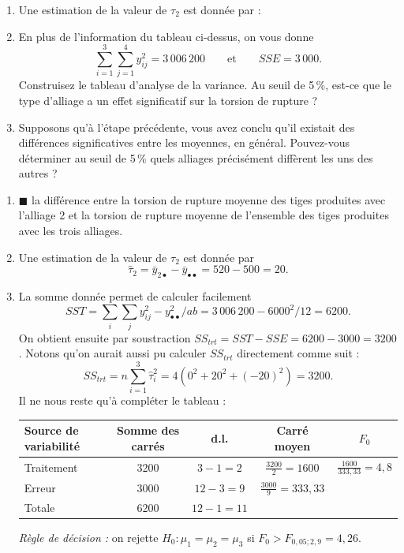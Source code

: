 \begin{exercice}
\begin{enumerate}[label=(\alph*)]
  \item Une estimation de la valeur de $\tau_2$ est donnée par :
  \item En plus de l'information du tableau ci-dessus, on vous donne
  \[
    \sum_{i=1}^{3}\sum_{j=1}^{4}y^2_{ij}=3\,006\,200
    \qquad\text{et}\qquad SSE=3\,000.
  \]
  Construisez le tableau d'analyse de la variance. Au seuil de 5\,\%, est-ce que le type
  d'alliage a un effet significatif sur la torsion de rupture ?
  \item Supposons qu'à l'étape précédente, vous avez conclu qu'il existait des différences
  significatives entre les moyennes, en général. Pouvez-vous déterminer au seuil de 5\,\%
  quels alliages précisément diffèrent les uns des autres ?
\end{enumerate}
\begin{solution}
\begin{enumerate}[label=(\alph*)]
  \item $\blacksquare$ la différence entre la torsion de rupture moyenne des tiges produites
  avec l'alliage 2 et la torsion de rupture moyenne de l'ensemble des tiges produites avec
  les trois alliages.
  \item Une estimation de la valeur de $\tau_2$ est donnée par
  \[
    \hat\tau_2=\bar y_{2\bullet}-\bar y_{\bullet\bullet}=520-500=20.
  \]
  \item La somme donnée permet de calculer facilement
  \[
    SST=\sum_i\sum_j y^2_{ij}-y^2_{\bullet\bullet}/ab=3\,006\,200-6000^2/12=6200.
  \]
  On obtient ensuite par soustraction
  $SS_{trt}=SST-SSE=6200-3000=3200$. Notons qu'on aurait aussi pu calculer $SS_{trt}$
  directement comme suit :
  \[
    SS_{trt}=n\sum_{i=1}^{3}\hat\tau_i^2=4\left(0^2+20^2+(-20)^2\right)=3200.
  \]
  Il ne nous reste qu'à compléter le tableau :
  \begin{center}
  \begin{tabular}{lcccc}
    \toprule
    Source de variabilité & Somme des carrés & d.l. & Carré moyen & $F_0$\\
    \midrule
    Traitement & 3200 & $3-1=2$ & $\frac{3200}{2}=1600$ & $\frac{1600}{333,33}=4,8$\\[3pt]
    Erreur & 3000 & $12-3=9$ & $\frac{3000}{9}=333,33$ & \\[3pt]
    Totale & 6200 & $12-1=11$ & & \\
    \bottomrule
  \end{tabular}
  \end{center}
  \emph{Règle de décision :} on rejette $H_0:\mu_1=\mu_2=\mu_3$ si
  $F_0>F_{0,05;2,9}=4,26$.


\end{enumerate}
\end{solution}
\end{exercice}
